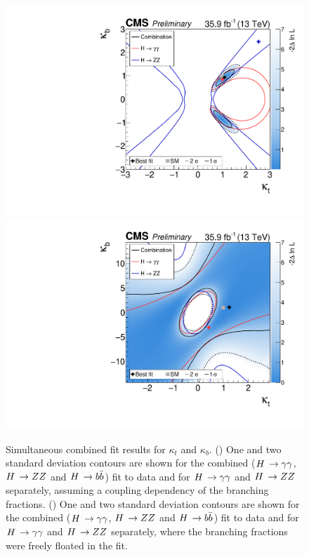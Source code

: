 \begin{figure}[hbtp]
  \begin{center}
    \includegraphics[width=0.49\linewidth]{img/resultsapproval/reworked/multicont_ktkb_couplingdependentBRs.pdf}
    \includegraphics[width=0.49\linewidth]{img/resultsapproval/reworked/multicont_ktkb_floatingBRs.pdf}
    \caption{
        Simultaneous combined fit results for $\kappa_t$ and $\kappa_b$.
        (\cmsLeft) One and two standard deviation contours are shown for the combined ($H\,\to\gamma\gamma$, $H\,\to ZZ$ and $H\,\to b\bar{b}$) fit to data and for $H\,\to\gamma\gamma$ and $H\,\to ZZ$ separately, assuming a coupling dependency of the branching fractions.
        (\cmsRight) One and two standard deviation contours are shown for the combined ($H\,\to\gamma\gamma$, $H\,\to ZZ$ and $H\,\to b\bar{b}$) fit to data and for $H\,\to\gamma\gamma$ and $H\,\to ZZ$ separately, where the branching fractions were freely floated in the fit.
        }
    \label{fig:scans_kappatkappab_rawInput}
  \end{center}
\end{figure}



